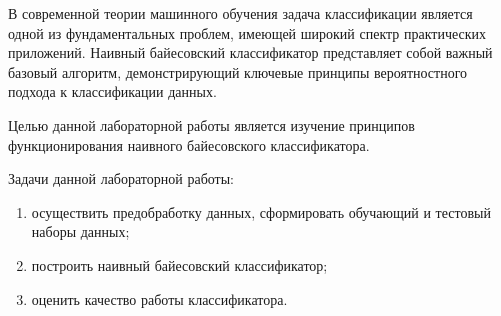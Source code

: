 
В современной теории машинного обучения задача классификации является одной из фундаментальных проблем, имеющей широкий спектр практических приложений. Наивный байесовский классификатор представляет собой важный базовый алгоритм, демонстрирующий ключевые принципы вероятностного подхода к классификации данных.

Целью данной лабораторной работы является изучение принципов функционирования наивного байесовского классификатора.

Задачи данной лабораторной работы:
\begin{enumerate}[label*=\arabic*)]
	\item осуществить предобработку данных, сформировать обучающий и тестовый наборы данных;
	\item построить наивный байесовский классификатор;
	\item оценить качество работы классификатора.
\end{enumerate}

\clearpage
